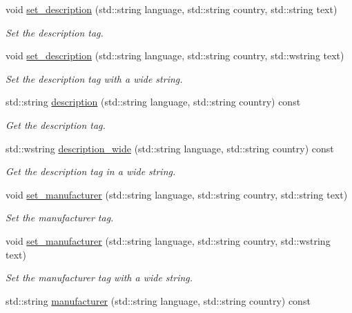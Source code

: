 \begin{DoxyCompactItemize}
void \hyperlink{class_c_m_s_1_1_profile_a636e6a2629c4e806a3eb8f2b2a7dc340}{set\+\_\+description} (std\+::string language, std\+::string country, std\+::string text)
\begin{DoxyCompactList}\small\item\em Set the description tag. \end{DoxyCompactList}\item 
void \hyperlink{class_c_m_s_1_1_profile_a22b8574b4cf1fe0ca211fb6df9e81259}{set\+\_\+description} (std\+::string language, std\+::string country, std\+::wstring text)
\begin{DoxyCompactList}\small\item\em Set the description tag with a wide string. \end{DoxyCompactList}\item 
std\+::string \hyperlink{class_c_m_s_1_1_profile_a1b2e3e2229a9cc307aa6bc4993640815}{description} (std\+::string language, std\+::string country) const
\begin{DoxyCompactList}\small\item\em Get the description tag. \end{DoxyCompactList}\item 
std\+::wstring \hyperlink{class_c_m_s_1_1_profile_a0c533b394f01ba7ea265652c77459ad7}{description\+\_\+wide} (std\+::string language, std\+::string country) const
\begin{DoxyCompactList}\small\item\em Get the description tag in a wide string. \end{DoxyCompactList}\item 
void \hyperlink{class_c_m_s_1_1_profile_a628c7662b1e3986089c807738bdc8cd5}{set\+\_\+manufacturer} (std\+::string language, std\+::string country, std\+::string text)
\begin{DoxyCompactList}\small\item\em Set the manufacturer tag. \end{DoxyCompactList}\item 
void \hyperlink{class_c_m_s_1_1_profile_a2a10ecfe0b67cb72be7d0afa9717dcee}{set\+\_\+manufacturer} (std\+::string language, std\+::string country, std\+::wstring text)
\begin{DoxyCompactList}\small\item\em Set the manufacturer tag with a wide string. \end{DoxyCompactList}\item 
std\+::string \hyperlink{class_c_m_s_1_1_profile_a1fbb59d9f6e769da91b34b4d38fa4e57}{manufacturer} (std\+::string language, std\+::string country) const

\end{DoxyCompactItemize}

